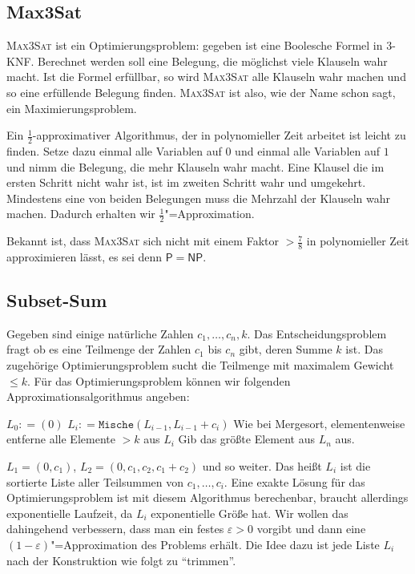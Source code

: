 \subsection{Max3Sat}
\textsc{Max3Sat} ist ein Optimierungsproblem: gegeben ist eine Boolesche Formel in 3-KNF. Berechnet werden soll eine Belegung, die möglichst viele Klauseln wahr macht. Ist die Formel erfüllbar, so wird \textsc{Max3Sat} alle Klauseln wahr machen und so eine erfüllende Belegung finden. \textsc{Max3Sat} ist also, wie der Name schon sagt, ein Maximierungsproblem.

Ein $\frac{1}{2}$-approximativer Algorithmus, der in polynomieller Zeit arbeitet ist leicht zu finden. Setze dazu einmal alle Variablen auf $0$ und einmal alle Variablen auf $1$ und nimm die Belegung, die mehr Klauseln wahr macht. Eine Klausel die im ersten Schritt nicht wahr ist, ist im zweiten Schritt wahr und umgekehrt. Mindestens eine von beiden Belegungen muss die Mehrzahl der Klauseln wahr machen. Dadurch erhalten wir $\frac{1}{2}$"=Approximation.

Bekannt ist, dass \textsc{Max3Sat} sich nicht mit einem Faktor $>\frac{7}{8}$ in polynomieller Zeit approximieren lässt, es sei denn $\mathsf{P}=\mathsf{NP}$.

\subsection{Subset-Sum}
Gegeben sind einige natürliche Zahlen $c_1, \ldots, c_n, k$. Das Entscheidungsproblem fragt ob es eine Teilmenge der Zahlen $c_1$ bis $c_n$ gibt, deren Summe $k$ ist. Das zugehörige Optimierungsproblem sucht die Teilmenge mit maximalem Gewicht $\le k$. Für das Optimierungsproblem können wir folgenden Approximationsalgorithmus angeben:

\begin{Alg}
  \begin{algorithmic}[1]
    \State $L_0 \mathrel{\mathop:}= (0)$
      \State $L_i \mathrel{\mathop:}= \mathtt{Mische}(L_{i-1}, L_{i-1} + c_i)$ \Comment Wie bei Mergesort, elementenweise
      \State entferne alle Elemente $>k$ aus $L_i$
    \EndFor
    \State Gib das größte Element aus $L_n$ aus.
  \end{algorithmic}
\end{Alg}

$L_1 = (0, c_1)$, $L_2 = (0, c_1, c_2, c_1 + c_2)$ und so weiter. Das heißt $L_i$ ist die sortierte Liste aller Teilsummen von $c_1, \ldots, c_i$. Eine exakte Lösung für das Optimierungsproblem ist mit diesem Algorithmus berechenbar, braucht allerdings exponentielle Laufzeit, da $L_i$ exponentielle Größe hat. Wir wollen das dahingehend verbessern, dass man ein festes $\varepsilon > 0$ vorgibt und dann eine $(1 - \varepsilon)$"=Approximation des Problems erhält. Die Idee dazu ist jede Liste $L_i$ nach der Konstruktion wie folgt zu "`trimmen"'.

